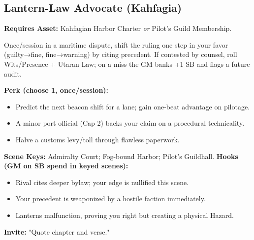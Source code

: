 \subsection{Lantern-Law Advocate (Kahfagia)}
\textbf{Requires Asset:} Kahfagian Harbor Charter \emph{or} Pilot's Guild Membership.
\begin{tcolorbox}[enhanced,sharp corners,boxrule=.6pt,title={Talent — Jurisdiction on the Tide (5 XP)}]
Once/session in a maritime dispute, shift the ruling one step in your favor (guilty→fine, fine→warning) by citing precedent. If contested by counsel, roll Wits/Presence + Utaran Law; on a miss the GM banks +1 SB and flags a future audit.
\end{tcolorbox}
\textbf{Perk (choose 1, once/session):}
\begin{itemize}
  \item Predict the next beacon shift for a lane; gain one-beat advantage on pilotage.
  \item A minor port official (Cap 2) backs your claim on a procedural technicality.
  \item Halve a customs levy/toll through flawless paperwork.
\end{itemize}
\textbf{Scene Keys:} Admiralty Court; Fog-bound Harbor; Pilot's Guildhall.
\textbf{Hooks (GM on SB spend in keyed scenes):}
\begin{itemize}
  \item Rival cites deeper bylaw; your edge is nullified this scene.
  \item Your precedent is weaponized by a hostile faction immediately.
  \item Lanterns malfunction, proving you right but creating a physical Hazard.
\end{itemize}
\textbf{Invite:} "Quote chapter and verse."

